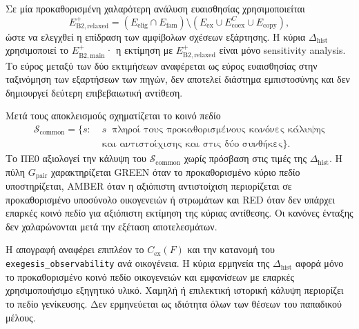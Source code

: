 \documentclass[11pt,a4paper]{article}
\begin{document}
Σε μία προκαθορισμένη χαλαρότερη ανάλυση ευαισθησίας χρησιμοποιείται
\[
E_{\mathrm{B2,relaxed}}^+=(E_{\mathrm{elig}}\cap E_{\mathrm{fam}})\setminus(E_{\mathrm{ex}}\cup E_{\mathrm{coex}}^{C}\cup E_{\mathrm{copy}}),
\]
ώστε να ελεγχθεί η επίδραση των αμφίβολων σχέσεων εξάρτησης. Η κύρια $\Delta_{\mathrm{hist}}$ χρησιμοποιεί το $E_{\mathrm{B2,main}}^+$· η εκτίμηση με $E_{\mathrm{B2,relaxed}}^+$ είναι μόνο sensitivity analysis. Το εύρος μεταξύ των δύο εκτιμήσεων αναφέρεται ως εύρος ευαισθησίας στην ταξινόμηση των εξαρτήσεων των πηγών, δεν αποτελεί διάστημα εμπιστοσύνης και δεν δημιουργεί δεύτερη επιβεβαιωτική αντίθεση.

Μετά τους αποκλεισμούς σχηματίζεται το κοινό πεδίο
\[
\begin{aligned}
\mathcal S_{\mathrm{common}}=\{s:\;& s\ \text{ πληροί τους προκαθορισμένους κανόνες κάλυψης}\\
&\text{και αντιστοίχισης και στις δύο συνθήκες}\}.
\end{aligned}
\]
Το ΠΕ0 αξιολογεί την κάλυψη του $\mathcal S_{\mathrm{common}}$ χωρίς πρόσβαση στις τιμές της $\Delta_{\mathrm{hist}}$. Η πύλη $G_{\mathrm{pair}}$ χαρακτηρίζεται GREEN όταν το προκαθορισμένο κύριο πεδίο υποστηρίζεται, AMBER όταν η αξιόπιστη αντιστοίχιση περιορίζεται σε προκαθορισμένο υποσύνολο οικογενειών ή στρωμάτων και RED όταν δεν υπάρχει επαρκές κοινό πεδίο για αξιόπιστη εκτίμηση της κύριας αντίθεσης. Οι κανόνες ένταξης δεν χαλαρώνονται μετά την εξέταση αποτελεσμάτων.

Η απογραφή αναφέρει επιπλέον το $C_{\mathrm{ex}}(F)$ και την κατανομή του \texttt{exegesis\_observability} ανά οικογένεια. Η κύρια ερμηνεία της $\Delta_{\mathrm{hist}}$ αφορά μόνο το προκαθορισμένο κοινό πεδίο οικογενειών και εμφανίσεων με επαρκές χρησιμοποιήσιμο εξηγητικό υλικό. Χαμηλή ή επιλεκτική ιστορική κάλυψη περιορίζει το πεδίο γενίκευσης. Δεν ερμηνεύεται ως ιδιότητα όλων των θέσεων του παπαδικού μέλους.
\end{document}
